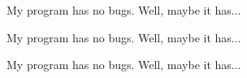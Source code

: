 
\begin{DoxyRefList}
\item[Class \mbox{\hyperlink{class_b_s_t}{B\+ST$<$ T $>$}} ]\label{bug__bug000001}%
%
My program has no bugs. Well, maybe it has...  
\item[Class \mbox{\hyperlink{classdate}{date}} ]\label{bug__bug000002}%
%
My program has no bugs. Well, maybe it has...  
\item[Class \mbox{\hyperlink{classtime}{time}} ]\label{bug__bug000003}%
%
My program has no bugs. Well, maybe it has... 
\end{DoxyRefList}